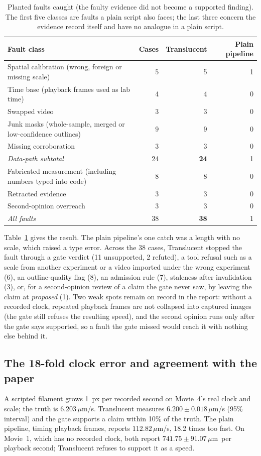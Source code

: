 \documentclass[11pt]{article}
\newcommand{\um}{\,$\mu$m}
\begin{document}
\begin{table}[t]
\centering\small
\caption{Planted faults caught (the faulty evidence did not become a supported finding). The first five classes are
faults a plain script also faces; the last three concern the evidence record itself and have no analogue in a plain
script.}
\label{tab:faults}
\begin{tabular}{@{}lrrr@{}}
\toprule
Fault class & Cases & Translucent & Plain pipeline \\
\midrule
Spatial calibration (wrong, foreign or missing scale) & 5 & 5 & 1 \\
Time base (playback frames used as lab time) & 4 & 4 & 0 \\
Swapped video & 3 & 3 & 0 \\
Junk masks (whole-sample, merged or low-confidence outlines) & 9 & 9 & 0 \\
Missing corroboration & 3 & 3 & 0 \\
\midrule
\emph{Data-path subtotal} & 24 & \textbf{24} & 1 \\
\midrule
Fabricated measurement (including numbers typed into code) & 8 & 8 & 0 \\
Retracted evidence & 3 & 3 & 0 \\
Second-opinion overreach & 3 & 3 & 0 \\
\midrule
\emph{All faults} & 38 & \textbf{38} & 1 \\
\bottomrule
\end{tabular}
\end{table}

Table~\ref{tab:faults} gives the result. The plain pipeline's one catch was a length with no scale, which raised a
type error. Across the 38 cases, Translucent stopped the fault through a gate verdict (11 unsupported, 2 refuted), a
tool refusal such as a scale from another experiment or a video imported under the wrong experiment (6), an
outline-quality flag (8), an admission rule (7), staleness after invalidation (3), or, for a second-opinion review of
a claim the gate never saw, by leaving the claim at \emph{proposed} (1). Two weak spots remain on record in the
report: without a recorded clock, repeated playback frames are not collapsed into captured images (the gate still
refuses the resulting speed), and the second opinion runs only after the gate says supported, so a fault the gate
missed would reach it with nothing else behind it.

\subsection{The 18-fold clock error and agreement with the paper}
A scripted filament grows 1~px per recorded second on Movie~4's real clock and scale; the truth is 6.203\um/s.
Translucent measures $6.200 \pm 0.018$\um/s (95\% interval) and the gate supports a claim within 10\% of the truth.
The plain pipeline, timing playback frames, reports $112.82$\um/s, 18.2 times too fast. On Movie~1, which has no
recorded clock, both report $741.75 \pm 91.07$\um\ per playback second; Translucent refuses to support it as a speed.
\end{document}
